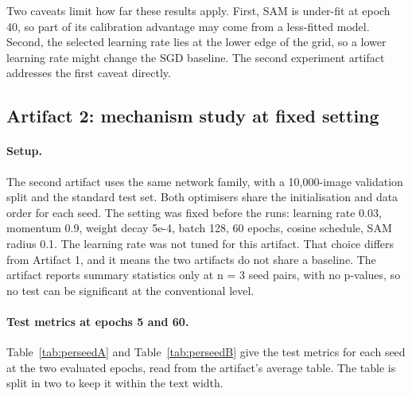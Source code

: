 \documentclass[11pt,letterpaper]{article}
\begin{document}
Two caveats limit how far these results apply. First, SAM is under-fit at epoch 40, so part of its calibration advantage may come from a less-fitted model. Second, the selected learning rate lies at the lower edge of the grid, so a lower learning rate might change the SGD baseline. The second experiment artifact addresses the first caveat directly.

\subsection{Artifact 2: mechanism study at fixed setting}

\paragraph{Setup.} The second artifact uses the same network family, with a 10,000-image validation split and the standard test set. Both optimisers share the initialisation and data order for each seed. The setting was fixed before the runs: learning rate 0.03, momentum 0.9, weight decay 5e-4, batch 128, 60 epochs, cosine schedule, SAM radius 0.1. The learning rate was not tuned for this artifact. That choice differs from Artifact 1, and it means the two artifacts do not share a baseline. The artifact reports summary statistics only at n = 3 seed pairs, with no p-values, so no test can be significant at the conventional level.

\paragraph{Test metrics at epochs 5 and 60.} Table~\ref{tab:perseedA} and Table~\ref{tab:perseedB} give the test metrics for each seed at the two evaluated epochs, read from the artifact's average table. The table is split in two to keep it within the text width.
\end{document}
